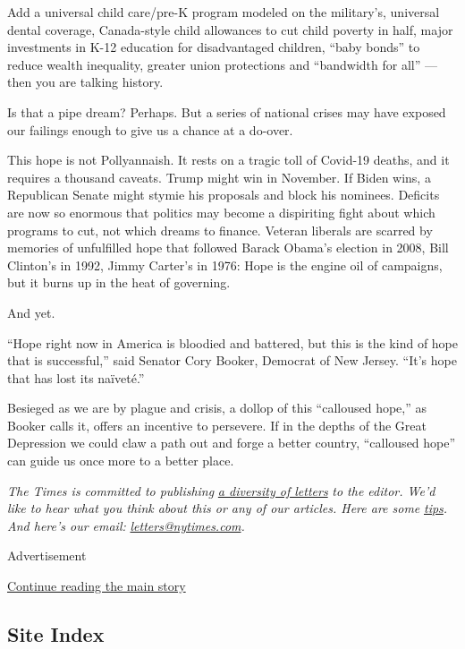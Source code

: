 Add a universal child care/pre-K program modeled on the military's,
universal dental coverage, Canada-style child allowances to cut child
poverty in half, major investments in K-12 education for disadvantaged
children, ``baby bonds'' to reduce wealth inequality, greater union
protections and ``bandwidth for all'' --- then you are talking history.

Is that a pipe dream? Perhaps. But a series of national crises may have
exposed our failings enough to give us a chance at a do-over.

This hope is not Pollyannaish. It rests on a tragic toll of Covid-19
deaths, and it requires a thousand caveats. Trump might win in November.
If Biden wins, a Republican Senate might stymie his proposals and block
his nominees. Deficits are now so enormous that politics may become a
dispiriting fight about which programs to cut, not which dreams to
finance. Veteran liberals are scarred by memories of unfulfilled hope
that followed Barack Obama's election in 2008, Bill Clinton's in 1992,
Jimmy Carter's in 1976: Hope is the engine oil of campaigns, but it
burns up in the heat of governing.

And yet.

``Hope right now in America is bloodied and battered, but this is the
kind of hope that is successful,'' said Senator Cory Booker, Democrat of
New Jersey. ``It's hope that has lost its naïveté.''

Besieged as we are by plague and crisis, a dollop of this ``calloused
hope,'' as Booker calls it, offers an incentive to persevere. If in the
depths of the Great Depression we could claw a path out and forge a
better country, ``calloused hope'' can guide us once more to a better
place.

\emph{The Times is committed to publishing}
\href{https://www.nytimes.com/2019/01/31/opinion/letters/letters-to-editor-new-york-times-women.html}{\emph{a
diversity of letters}} \emph{to the editor. We'd like to hear what you
think about this or any of our articles. Here are some}
\href{https://help.nytimes.com/hc/en-us/articles/115014925288-How-to-submit-a-letter-to-the-editor}{\emph{tips}}\emph{.
And here's our email:}
\href{mailto:letters@nytimes.com}{\emph{letters@nytimes.com}}\emph{.}

Advertisement

\protect\hyperlink{after-bottom}{Continue reading the main story}

\hypertarget{site-index}{%
\subsection{Site Index}\label{site-index}}

